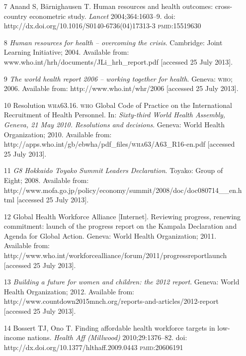 \documentclass{article}
\begin{document}
\begin{itemize}
\item[7] Anand S, Bärnighausen T. Human resources and health outcomes:
cross-country
econometric study. \textit{Lancet}
2004;364:1603–9. doi:
http://dx.doi.org/10.1016/S0140-6736(04)17313-3 \textsc{pmid}:15519630

\item[8] \textit{Human resources for health – overcoming the crisis}. Cambridge:
Joint Learning Initiative; 2004. Available from:
www.who.int/hrh/documents/JLi\_{}hrh\_{}report.pdf
[accessed 25 July 2013].

\item[9] \textit{The world health report 2006 – working together for health}. Geneva:
\textsc{who}; 2006. Available from: http://www.who.int/whr/2006 [accessed 25 July 2013].

\item[10] Resolution \textsc{wha}63.16. \textsc{who} Global Code of Practice on the International
Recruitment of
Health Personnel. In: \textit{Sixty-third World Health Assembly, Geneva, 21 May
2010. Resolutions
and decisions}. Geneva: World Health Organization; 2010. Available from:
http://apps.who.int/gb/ebwha/pdf\_{}files/\textsc{wha}63/A63\_{}R16-en.pdf [accessed 25
July
2013].

\item[11] \textit{G8 Hokkaido Toyako Summit Leaders Declaration}. Toyako: Group of
Eight; 2008. Available from:
http://www.mofa.go.jp/policy/economy/summit/2008/doc/doc080714\_{}\_{}en.html
[accessed 25 July 2013].

\item[12] Global Health Workforce Alliance [Internet]. Reviewing progress,
renewing
commitment: launch of the progress report on the Kampala Declaration and Agenda
for Global Action.
Geneva: World Health Organization; 2011. Available from:
http://www.who.int/workforcealliance/forum/2011/progressreportlaunch [accessed
25 July
2013].

\item[13] \textit{Building a future for women and children: the 2012 report}. Geneva:
World Health Organization; 2012. Available from:
http://www.countdown2015mnch.org/reports-and-articles/2012-report [accessed 25
July
2013].

\item[14] Bossert TJ, Ono T. Finding affordable health workforce targets in
low-income
nations. \textit{Health Aff (Millwood)}
2010;29:1376–82. doi:
http://dx.doi.org/10.1377/hlthaff.2009.0443 \textsc{pmid}:20606191


\end{itemize}
\end{document}
